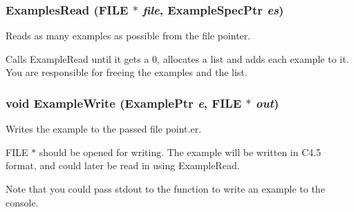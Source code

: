 \subsubsection{ Examples\-Read (FILE $\ast$ {\em file}, {\bf Example\-Spec\-Ptr} {\em es})}\label{Example_8h_a19}


Reads as many examples as possible from the file pointer. 

Calls Example\-Read until it gets a 0, allocates a list and adds each example to it. You are responsible for freeing the examples and the list. 
\subsubsection{\setlength{\rightskip}{0pt plus 5cm}void Example\-Write ({\bf Example\-Ptr} {\em e}, FILE $\ast$ {\em out})}\label{Example_8h_a26}


Writes the example to the passed file point.er. 

FILE $\ast$ should be opened for writing. The example will be written in C4.5 format, and could later be read in using Example\-Read.

Note that you could pass stdout to the function to write an example to the console. 